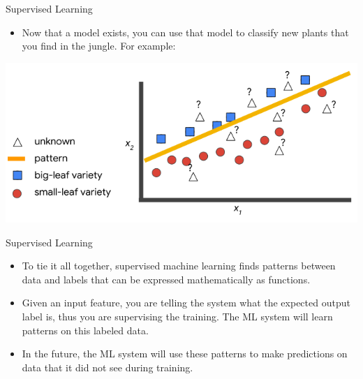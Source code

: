 \documentclass{beamer}
\begin{document}
\begin{frame}{Supervised Learning}

\begin{itemize}
\item Now that a model exists, you can use that model to classify new plants that you find in the jungle. For example:
\end{itemize}

\bigskip

\includegraphics[width=\textwidth]{images/Graph3.png}

\end{frame}


\begin{frame}{Supervised Learning}

\begin{itemize}
\item To tie it all together, supervised machine learning finds patterns between data and labels that can be expressed mathematically as functions. 

\item Given an input feature, you are telling the system what the expected output label is, thus you are supervising the training. The ML system will learn patterns on this labeled data. 

\item In the future, the ML system will use these patterns to make predictions on data that it did not see during training.

\end{itemize}

\end{frame}

\end{document}
